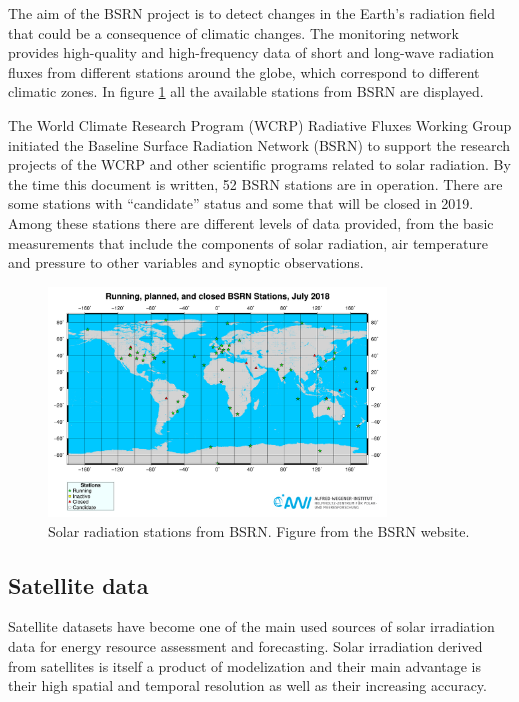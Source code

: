 
The aim of the BSRN project is to detect changes in the Earth's radiation field that could be a consequence of climatic changes. The monitoring network provides high-quality and high-frequency data of short and long-wave radiation fluxes from different stations around the globe, which correspond to different climatic zones. In figure \ref{fig:bsrnstations} all the available stations from BSRN are displayed.

The World Climate Research Program (WCRP) Radiative Fluxes Working Group initiated the Baseline Surface Radiation Network (BSRN) to support the research projects of the WCRP and other scientific programs related to solar radiation. By the time this document is written, 52 BSRN stations are in operation. There are some stations with ``candidate'' status and some that will be closed in 2019. Among these stations there are different levels of data provided, from the basic measurements that include the components of solar radiation, air temperature and pressure to other variables and synoptic observations.

\begin{figure}[h]
  \centering
  \includegraphics[width=0.8\textwidth]{DataMethodsFIGS/bsrn.pdf}
  \caption[Map of BSRN stations]{Solar radiation stations from BSRN. Figure from the BSRN website.}
 \label{fig:bsrnstations}
\end{figure}

\subsection{Satellite data}
 
Satellite datasets have become one of the main used sources of solar irradiation data for energy resource assessment and forecasting. Solar irradiation derived from satellites is itself a product of modelization and their main advantage is their high spatial and temporal resolution as well as their increasing accuracy. 

